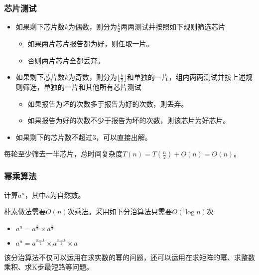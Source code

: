 \documentclass{ctexbeamer}
\begin{document}
    \begin{frame}
        \frametitle{芯片测试}

        \begin{itemize}
            \item 如果剩下芯片数$k$为偶数，则分为$\frac{k}{2}$两两测试并按照如下规则筛选芯片
                \begin{itemize}
                    \item 如果两片芯片报告都为好，则任取一片。
                    \item 否则两片芯片全都丢弃。
                \end{itemize}
            \item 如果剩下芯片数$k$为奇数，则分为$\lfloor \frac{k}{2} \rfloor$和单独的一片，组内两两测试并按上述规则筛选，单独的一片和其他所有芯片测试
                \begin{itemize}
                    \item 如果报告为坏的次数多于报告为好的次数，则丢弃。
                    \item 如果报告为好的次数不少于报告为坏的次数，则该芯片为好芯片。
                \end{itemize}
            \item 如果剩下的芯片数不超过$3$，可以直接出解。
        \end{itemize}

        每轮至少筛去一半芯片，总时间复杂度$T(n) = T(\frac{n}{2}) + O(n) = O(n)$。

    \end{frame}


    \begin{frame}
        \frametitle{幂乘算法}

        计算$a^n$，其中$n$为自然数。

        朴素做法需要$O(n)$次乘法。采用如下分治算法只需要$O(\log n)$次

        \begin{itemize}
            \item $a^n = a^{\frac{n}{2}} \times a^{\frac{n}{2}}$
            \item $a^n = a^{\frac{n-1}{2}} \times a^{\frac{n-1}{2}} \times a$
        \end{itemize}

        该分治算法不仅可以运用在求实数的幂的问题，还可以运用在求矩阵的幂、求整数乘积、求K步最短路等问题。
        
    \end{frame}
\end{document}

